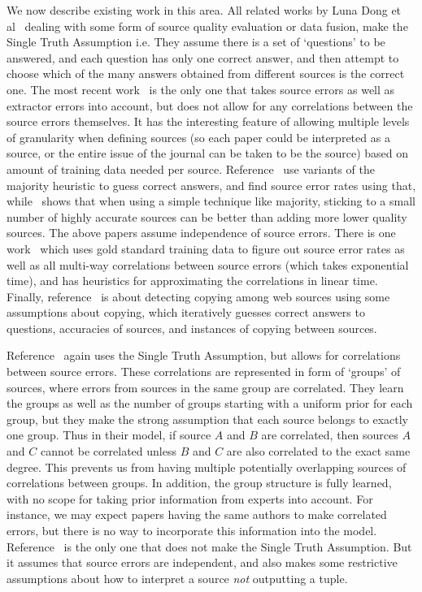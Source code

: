 \documentclass{sig-alternate}
\begin{document}
We now describe existing work in this area. All related works by Luna Dong et al~\cite{DBLP:journals/corr/DongGMDHLSZ15,6228170,Pochampally:2014:FDC:2588555.2593674,Dong:2012:LMS:2448936.2448938,Dong:2014:DFK:2732951.2732962} dealing with some form of source quality evaluation or data fusion, make the Single Truth Assumption i.e. They assume there is a set of `questions' to be answered, and each question has only one correct answer, and then attempt to choose which of the many answers obtained from different sources is the correct one. The most recent work~\cite{DBLP:journals/corr/DongGMDHLSZ15} is the only one that takes source errors as well as extractor errors into account, but does not allow for any correlations between the source errors themselves. It has the interesting feature of allowing multiple levels of granularity when defining sources (so each paper could be interpreted as a source, or the entire issue of the journal can be taken to be the source) based on amount of training data needed per source. Reference~\cite{Dong:2014:DFK:2732951.2732962} use variants of the majority heuristic to guess correct answers, and find source error rates using that, while~\cite{Dong:2012:LMS:2448936.2448938} shows that when using a simple technique like majority, sticking to a small number of highly accurate sources can be better than adding more lower quality sources. The above papers assume independence of source errors. There is one work~\cite{Pochampally:2014:FDC:2588555.2593674} which uses gold standard training data to figure out source error rates as well as all multi-way correlations between source errors (which takes exponential time), and has heuristics for approximating the correlations in linear time. Finally, reference~\cite{6228170} is about detecting copying among web sources using some assumptions about copying, which iteratively guesses correct answers to questions, accuracies of sources, and instances of copying between sources. 

Reference~\cite{Qi:2013:MCI:2488388.2488479} again uses the Single Truth Assumption, but allows for correlations between source errors. These correlations are represented in form of `groups' of sources, where errors from sources in the same group are correlated. They learn the groups as well as the number of groups starting with a uniform prior for each group, but they make the strong assumption that each source belongs to exactly one group. Thus in their model, if source $A$ and $B$ are correlated, then sources $A$ and $C$ cannot be correlated unless $B$ and $C$ are also correlated to the exact same degree. This prevents us from having multiple potentially overlapping sources of correlations between groups. In addition, the group structure is fully learned, with no scope for taking prior information from experts into account. For instance, we may expect papers having the same authors to make correlated errors, but there is no way to incorporate this information into the model. Reference~\cite{Zhao:2012:BAD:2168651.2168656} is the only one that does not make the Single Truth Assumption. But it assumes that source errors are independent, and also makes some restrictive assumptions about how to interpret a source {\em not} outputting a tuple.
\end{document}
